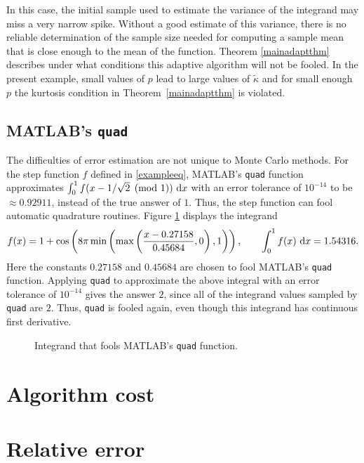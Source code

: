 \documentclass{article}
\begin{document}
In this case, the initial sample used to estimate the variance of the integrand may miss a very narrow spike.  Without a good estimate of this variance, there is no reliable determination of the sample size needed for computing a sample mean that is close enough to the mean of the function.  Theorem \ref{mainadaptthm} describes under what conditions this adaptive algorithm will not be fooled.
In the present example, small values of $p$ lead to large values
of $\tilde\kappa$ and for small enough $p$
the kurtosis condition in Theorem~\ref{mainadaptthm}
is violated.

\subsection{MATLAB's {\tt quad}}

The difficulties of error estimation are not unique to Monte Carlo methods. For the step function $f$ defined in \eqref{exampleeq}, MATLAB's {\tt quad} function approximates $\int_0^1 f(x - 1/\sqrt{2} \pmod 1) \, \,\mathrm{d} x$  with an error tolerance of $10^{-14}$ to be $\approx 0.92911$, instead of the true answer of $1$.  Thus, the step function can fool automatic quadrature routines.  Figure \ref{foolquadfig} displays the integrand
\[
f(x) = 1+\cos\left(8\pi\min\left(\max\left(\frac{x-0.27158}{0.45684},0\right),1\right)\right), \qquad \int_0^1 f(x) \, \,\mathrm{d} x = 1.54316.
\]
Here the constants $0.27158$ and $0.45684$ are chosen to fool MATLAB's {\tt quad} function.  Applying {\tt quad} to approximate the above integral with an error tolerance of $10^{-14}$ gives the answer $2$, since all of the integrand values sampled by {\tt quad} are $2$.  Thus, {\tt quad} is fooled again, even though this integrand has continuous first derivative.  

\begin{figure}
\centering
\caption{Integrand that fools MATLAB's {\tt quad} function. \label{foolquadfig}}
\end{figure}



\section{Algorithm cost}

\section{Relative error}
\end{document}
